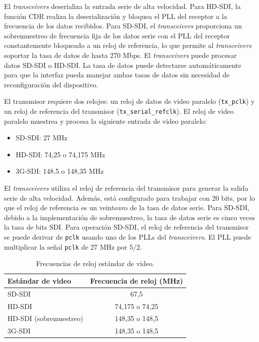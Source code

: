   El \textit{transceivers} deserializa la entrada serie de alta velocidad. Para
  HD-SDI, la función CDR realiza la deserialización y bloquea el PLL del receptor
  a la frecuencia de los datos recibidos. Para SD-SDI, el \textit{transceivers}
  proporciona un sobremuestreo de frecuencia fija de los datos serie con el PLL
  del receptor constantemente bloqueado a un reloj de referencia, lo que permite
  al \textit{transceivers} soportar la tasa de datos de hasta 270 Mbps.
  El \textit{transceivers} puede procesar datos SD-SDI o HD-SDI\@. La tasa de datos
  puede detectarse automáticamente para que la interfaz pueda manejar ambas tasas
  de datos sin necesidad de reconfiguración del dispositivo.

  El transmisor requiere dos relojes: un reloj de datos de video paralelo (\texttt{tx\_pclk})
  y un reloj de referencia del transmisor (\texttt{tx\_serial\_refclk}). El reloj
  de video paralelo muestrea y procesa la siguiente entrada de video paralelo:
  \begin{itemize}
      \item SD-SDI\@: 27 MHz
      \item HD-SDI\@: 74,25 o 74,175 MHz
      \item 3G-SDI\@: 148,5 o 148,35 MHz
  \end{itemize}

  El \textit{transceivers} utiliza el reloj de referencia del transmisor para
  generar la salida serie de alta velocidad. Además, está configurado para
  trabajar con 20 bits, por lo que el reloj de referencia es un veinteavo de la
  tasa de datos serie. Para SD-SDI, debido a la implementación de sobremuestreo,
  la tasa de datos serie es cinco veces la tasa de bits SDI\@.
  Para operación SD-SDI, el reloj de referencia del transmisor se puede derivar
  de \texttt{pclk} usando uno de los PLLs del \textit{transceivers}. El PLL puede
  multiplicar la señal \texttt{pclk} de 27 MHz por 5/2.

  \begin{table}[h]
    \caption{Frecuencias de reloj estándar de video.}
    \centering
    \begin{tabular}{lc}
      \toprule
      \textbf{Estándar de video}  & \textbf{Frecuencia de reloj (MHz)} \\
      \midrule
      SD-SDI                      & 67,5 \\
      HD-SDI                      & 74,175 o 74,25 \\
      HD-SDI (sobremuestreo)      & 148,35 o 148,5 \\
      3G-SDI                      & 148,35 o 148,5 \\
      \bottomrule
    \end{tabular}
  \end{table}


